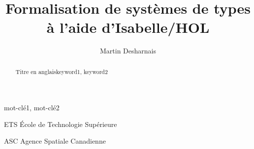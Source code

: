 \documentclass[letterpaper
, twoside
, 12pt
,these
,francais
,creativecommons,hyperref
]{thETS}
\title{Formalisation de systèmes de types à l'aide d'Isabelle/HOL}
\author{Martin Desharnais}
\begin{document}

\maketitle

\presentjury

\begin{avantpropos}

\lipsum[1] %

\end{avantpropos}



\begin{remerciements}

\lipsum[1] %


\end{remerciements}



\begin{sommaire}{mot-clé1, mot-clé2}

\lipsum[1] %

\end{sommaire}


\begin{abstract}{Titre en anglais}{keyword1, keyword2}

\lipsum[1] %

\end{abstract}


\tableofcontents


\listoftables


\listoffigures


\begin{listofabbr}[3cm]
\item [ETS] École de Technologie Supérieure
\item [ASC] Agence Spatiale Canadienne
\end{listofabbr}

\printglossaries
\end{document}
